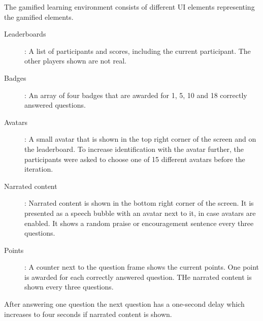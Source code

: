 The gamified learning environment consists of different UI elements representing the gamified elements.
\begin{description}
  \item[Leaderboards]: A list of participants and scores, including the current participant. The other players shown are not real.
  \item[Badges]: An array of four badges that are awarded for 1, 5, 10 and 18 correctly answered questions.
  \item[Avatars]: A small avatar that is shown in the top right corner of the screen and on the leaderboard. To increase identification with the avatar further, the participants were asked to choose one of 15 different avatars before the iteration.
  \item[Narrated content]: Narrated content is shown in the bottom right corner of the screen. It is presented as a speech bubble with an avatar next to it, in case avatars are enabled. It shows a random praise or encouragement sentence every three questions.
  \item[Points]: A counter next to the question frame shows the current points. One point is awarded for each correctly answered question. THe narrated content is shown every three questions.
\end{description}
After answering one question the next question has a one-second delay which increases to four seconds if narrated content is shown.
